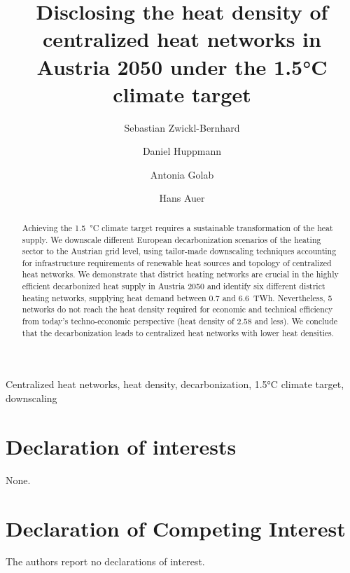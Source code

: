 \documentclass[review]{elsarticle}
\begin{document}
\begin{frontmatter}

\title{Disclosing the heat density of centralized heat networks in Austria 2050 under the 1.5°C climate target}
\author[1,2]{Sebastian Zwickl-Bernhard}
\author[2]{Daniel Huppmann}
\author[1]{Antonia Golab}
\author[1]{Hans Auer}
\address[1]{Energy Economics Group (EEG), Technische Universität Wien, Gusshausstrasse 25-29/E370-3, 1040 Wien, Austria}
\address[2]{Energy, Climate and Environment (ECE) Program,  International Institute for Applied Systems Analysis (IIASA), Laxenburg, Austria}

\begin{abstract}
	Achieving the \SI{1.5}{\degreeCelsius} climate target requires a sustainable transformation of the heat supply. We downscale different European decarbonization scenarios of the heating sector to the Austrian grid level, using tailor-made downscaling techniques accounting for infrastructure requirements of renewable heat sources and topology of centralized heat networks. We demonstrate that district heating networks are crucial in the highly efficient decarbonized heat supply in Austria 2050 and identify six different district heating networks, supplying heat demand between \SI{0.7}{} and \SI{6.6}{TWh}. Nevertheless, 5 networks do not reach the heat density required for economic and technical efficiency from today's techno-economic perspective (heat density of \SI{2.58}{} and less). We conclude that the decarbonization leads to centralized heat networks with lower heat densities. 
\end{abstract}

\begin{keyword}
	Centralized heat networks, heat density, decarbonization, 1.5°C climate target, downscaling
\end{keyword}
\end{frontmatter}

\newpage

\newpage

\newpage

\newpage





\section*{Declaration of interests}
None.
\section*{Declaration of Competing Interest}
The authors report no declarations of interest.
\end{document}

